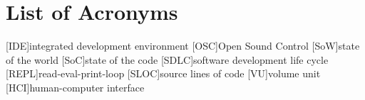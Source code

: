 
\chapter*{List of Acronyms}
\label{chap:acronyms}

\begin{acronym}[xxxxx]
[IDE]{integrated development environment}
[OSC]{Open Sound Control}
[SoW]{state of the world}
[SoC]{state of the code}
[SDLC]{software development life cycle}
[REPL]{read-eval-print-loop}
[SLOC]{source lines of code}
[VU]{volume unit}
[HCI]{human-computer interface}
\end{acronym}
